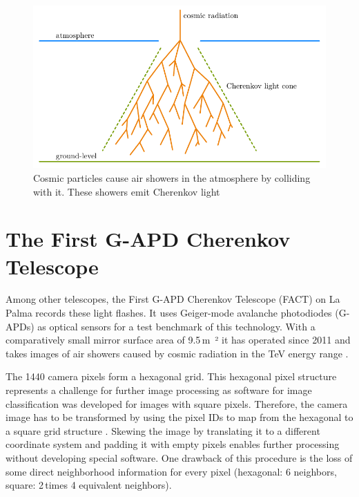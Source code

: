 \begin{figure}
    \centering
    \includegraphics[scale=1]{Plots/Air_Shower.pdf}
    \caption{Cosmic particles cause air showers in the atmosphere by colliding with it. These showers emit Cherenkov light}
    \label{fig:air_shower}
\end{figure}


\section{The First G-APD Cherenkov Telescope}
Among other telescopes, the First G-APD Cherenkov Telescope (FACT) on La Palma records these light flashes.
It uses Geiger-mode avalanche photodiodes (G-APDs) as optical sensors for a test benchmark of this technology.
With a comparatively small mirror surface area of \num{9.5}\,\si{\meter²} it has operated since \num{2011}
and takes images of air showers caused by cosmic radiation in the TeV energy range \cite{FACT}.

The \num{1440} camera pixels form a hexagonal grid.
This hexagonal pixel structure represents a challenge for further image processing
as software for image classification was developed for images with square pixels.
Therefore, the camera image has to be transformed by using the pixel IDs
to map from the hexagonal to a square grid structure \cite{hexagonal}.
Skewing the image by translating it to a different coordinate system and padding it with empty pixels
enables further processing without developing special software.
One drawback of this procedure is the loss of some direct neighborhood information for every pixel
(hexagonal: \num{6} neighbors, square: \num{2}\,times \num{4} equivalent neighbors).


